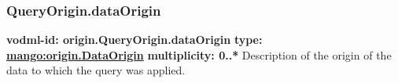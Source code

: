     \subsubsection{QueryOrigin.dataOrigin}
      \textbf{vodml-id: origin.QueryOrigin.dataOrigin} \newline
      \textbf{type: \hyperref[sect:origin.DataOrigin]{mango:origin.DataOrigin}} \newline
      \textbf{multiplicity: 0..*} \newline
      Description of the origin of the data to which the query was applied.
